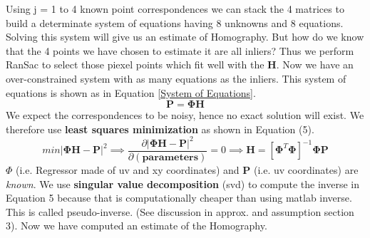 \documentclass[titlepage]{article}
\begin{document}
Using j = 1 to 4 known point correspondences we can stack the 4 matrices to build a determinate system of equations having 8 unknowns and 8 equations. Solving this system will give us an estimate of Homography. But how do we know that the 4 points we have chosen to estimate it are all inliers? Thus we perform RanSac to select those piexel points which fit well with the \textbf{H}. Now we have an over-constrained system with as many equations as the inliers. This system of equations is shown as in Equation \ref{System of Equations}. 
%
\begin{equation}
    \label{System of Equations}
    \mathbf{P} =  \mathbf{\Phi} \mathbf{H}
    \end{equation}
We expect the correspondences to be noisy, hence no exact solution will exist. We therefore use \textbf{least squares minimization} as shown in Equation (5).
\begin{equation}
\label{Least Squares}
min |\mathbf{\Phi} \mathbf{H} - \mathbf{P}|^2 \implies \frac{\partial {|\mathbf{\Phi} \mathbf{H} - \mathbf{P}|^2}}{\partial\mathbf{(parameters)}} = 0 \implies \mathbf{H} = [\mathbf{\Phi}^T \mathbf{\Phi}]^{-1} \mathbf{\Phi} \mathbf{P}
\end{equation}
$\Phi$ (i.e. Regressor made of uv and xy coordinates) and \textbf{P} (i.e. uv coordinates) are \textit{known}. We use \textbf{singular value decomposition} (svd) to compute the inverse in Equation 5 because that is computationally cheaper than using matlab inverse. This is called pseudo-inverse. (See discussion in approx. and assumption section 3). Now we have computed an estimate of the Homography.
\end{document}
